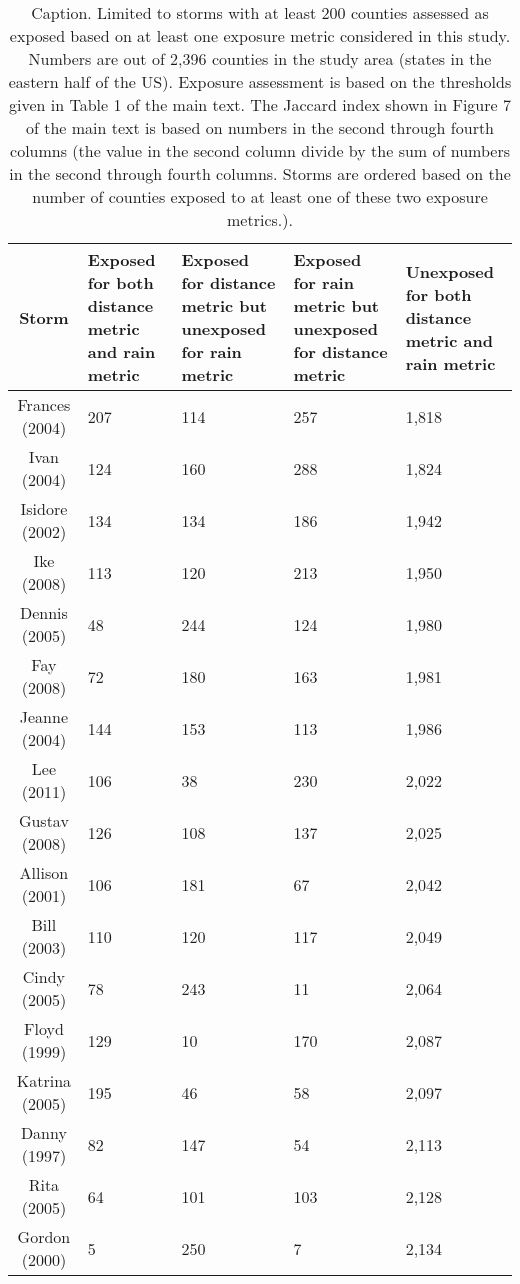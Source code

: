 \begin{table}[ht]
\centering
\caption{Caption. Limited to storms with at least 200 counties assessed as exposed based on at least one exposure metric considered in this study. Numbers are out of 2,396 counties in the study area (states in the eastern half of the US). Exposure assessment is based on the thresholds given in Table 1 of the main text. The Jaccard index shown in Figure 7 of the main text is based on numbers in the second through fourth columns (the value in the second column divide by the sum of numbers in the second through fourth columns.  Storms are ordered based on the number of counties exposed to at least one of these two exposure metrics.).} 
\label{tab:misclassrain}
\begin{tabular}{cP{3cm}P{3cm}P{3cm}P{3cm}}
  \toprule
Storm & Exposed for both distance metric and rain metric & Exposed for distance metric but unexposed for rain metric & Exposed for rain metric but unexposed for distance metric & Unexposed for both distance metric and rain metric \\ 
  \midrule
Frances (2004) & 207 & 114 & 257 & 1,818 \\ 
  Ivan (2004) & 124 & 160 & 288 & 1,824 \\ 
  Isidore (2002) & 134 & 134 & 186 & 1,942 \\ 
  Ike (2008) & 113 & 120 & 213 & 1,950 \\ 
  Dennis (2005) & 48 & 244 & 124 & 1,980 \\ 
  Fay (2008) & 72 & 180 & 163 & 1,981 \\ 
  Jeanne (2004) & 144 & 153 & 113 & 1,986 \\ 
  Lee (2011) & 106 & 38 & 230 & 2,022 \\ 
  Gustav (2008) & 126 & 108 & 137 & 2,025 \\ 
  Allison (2001) & 106 & 181 & 67 & 2,042 \\ 
  Bill (2003) & 110 & 120 & 117 & 2,049 \\ 
  Cindy (2005) & 78 & 243 & 11 & 2,064 \\ 
  Floyd (1999) & 129 & 10 & 170 & 2,087 \\ 
  Katrina (2005) & 195 & 46 & 58 & 2,097 \\ 
  Danny (1997) & 82 & 147 & 54 & 2,113 \\ 
  Rita (2005) & 64 & 101 & 103 & 2,128 \\ 
  Gordon (2000) & 5 & 250 & 7 & 2,134 \\ 

\end{tabular}
\end{table}
